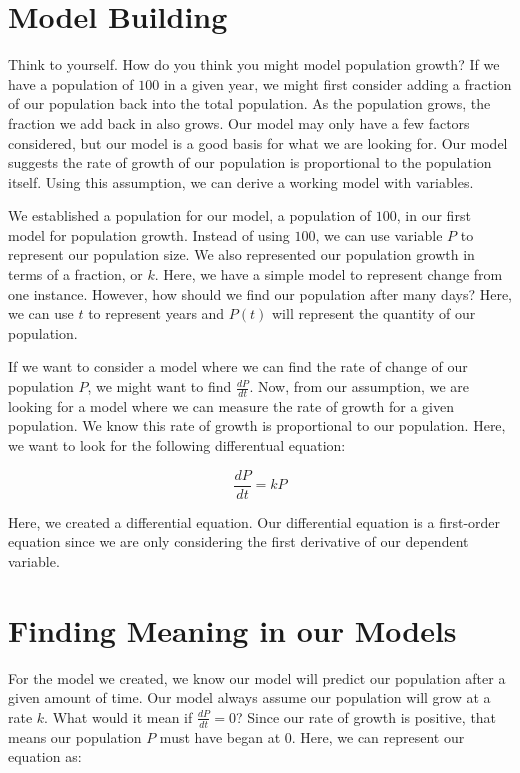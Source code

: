 \documentclass{amsart}
\theoremstyle{definition}
\numberwithin{equation}{section}
\begin{document}
\begin{sansmath}
\section{Model Building}

Think to yourself. How do you think you might model population growth? If we have a population of $100$ in a given year, we might first consider adding a fraction of our population back into the total population. As the population grows, the fraction we add back in also grows. Our model may only have a few factors considered, but our model is a good basis for what we are looking for. Our model suggests the rate of growth of our population is proportional to the population itself. Using this assumption, we can derive a working model with variables.

We established a population for our model, a population of $100$, in our first model for population growth. Instead of using $100$, we can use variable $P$ to represent our population size. We also represented our population growth in terms of a fraction, or $k$. Here, we have a simple model to represent change from one instance. However, how should we find our population after many days? Here, we can use $t$ to represent years and $P(t)$ will represent the quantity of our population.

If we want to consider a model where we can find the rate of change of our population $P$, we might want to find $\frac{dP}{dt}$. Now, from our assumption, we are looking for a model where we can measure the rate of growth for a given population. We know this rate of growth is proportional to our population. Here, we want to look for the following differentual equation:

\[ \frac{dP}{dt} = kP \]

Here, we created a differential equation. Our differential equation is a first-order equation since we are only considering the first derivative of our dependent variable.

\section{Finding Meaning in our Models}

For the model we created, we know our model will predict our population after a given amount of time. Our model always assume our population will grow at a rate $k$. What would it mean if $\frac{dP}{dt} = 0$? Since our rate of growth is positive, that means our population $P$ must have began at $0$. Here, we can represent our equation as:


\end{sansmath}
\end{document}

